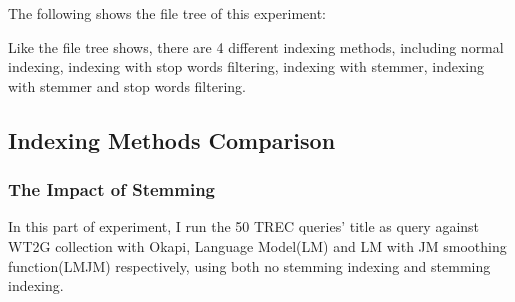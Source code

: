 \documentclass[10pt, a4paper]{article}
\begin{document}
The following shows the file tree of this experiment:


Like the file tree shows, there are 4 different indexing methods, including normal indexing, indexing with stop words filtering, indexing with stemmer, indexing with stemmer and stop words filtering.

\subsection{Indexing Methods Comparison}
\subsubsection{The Impact of Stemming}
In this part of experiment, I run the 50 TREC queries' title as query against WT2G collection with Okapi, Language Model(LM) and LM with JM smoothing function(LMJM) respectively, using both no stemming indexing and stemming indexing. 
\end{document}
